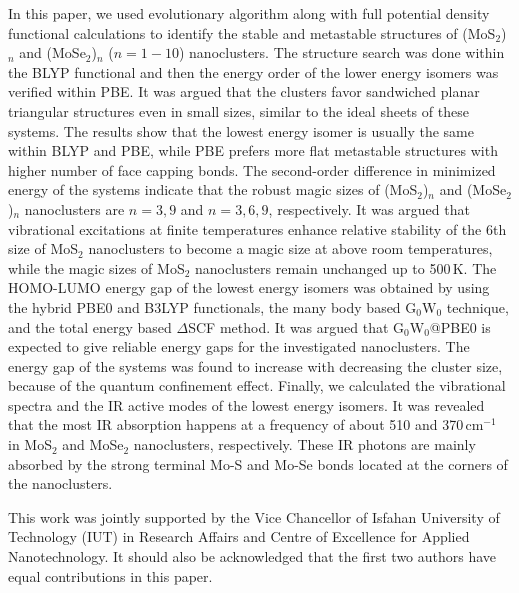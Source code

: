 \documentclass[nofootinbib,10pt,aip,twocolumn,showpacs]{revtex4-1}
\begin{document}
In this paper, we used evolutionary algorithm along with full potential
density functional calculations to identify the stable and metastable 
structures of (MoS$_2$)$_n$ and (MoSe$_2$)$_n$ ($n=1-10$) nanoclusters.
The structure search was done within the BLYP functional and
then the energy order of the lower energy isomers was verified within PBE.
It was argued that the clusters favor sandwiched planar triangular structures 
even in small sizes, similar to the ideal sheets of these systems.
The results show that the lowest energy isomer is usually the same within BLYP and PBE,
while PBE prefers more flat metastable structures with higher number 
of face capping bonds.
The second-order difference in minimized energy of the systems 
indicate that the robust magic sizes of (MoS$_2$)$_n$ and (MoSe$_2$)$_n$ 
nanoclusters are $n=3,9$ and $n=3,6,9$, respectively. 
It was argued that vibrational excitations at finite temperatures enhance 
relative stability of the 6th size of MoS$_2$ nanoclusters to become a magic size 
at above room temperatures,
while the magic sizes of MoS$_2$ nanoclusters remain unchanged up to 500\,K.
The HOMO-LUMO energy gap of the lowest energy isomers 
was obtained by using the hybrid PBE0 and B3LYP functionals, 
the many body based G$_0$W$_0$ technique,
and the total energy based $\Delta$SCF method.
It was argued that G$_0$W$_0$@PBE0 is expected to give 
reliable energy gaps for the investigated nanoclusters.
The energy gap of the systems was found to increase with decreasing
the cluster size, because of the quantum confinement effect.
Finally, we calculated the vibrational spectra and the IR active
modes of the lowest energy isomers.
It was revealed that the most IR absorption happens at a frequency of 
about 510 and 370\,cm$^{-1}$ in MoS$_2$ and MoSe$_2$ nanoclusters, respectively.
These IR photons are mainly absorbed by the strong terminal
Mo-S and Mo-Se bonds located at the corners of the nanoclusters.

\begin{acknowledgments}
This work was jointly supported by the Vice Chancellor
of Isfahan University of Technology (IUT) in Research Affairs and
Centre of Excellence for Applied Nanotechnology.
It should also be acknowledged that the first two authors
have equal contributions in this paper.
\end{acknowledgments}


\end{document}
